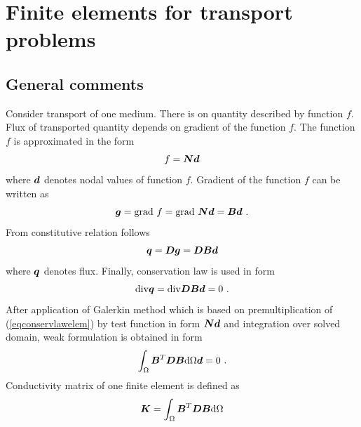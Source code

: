 \chapter{Finite elements for transport problems}
\label{finitelements}

\section{General comments}
\label{sectgencom}

Consider transport of one medium. There is on quantity described by function $f$.
Flux of transported quantity depends on gradient of the function $f$. The function
$f$ is approximated in the form
\begin{equation}
f = \mbox{\boldmath$N$} \mbox{\boldmath$d$}
\end{equation}
where $\mbox{\boldmath$d$}$ denotes nodal values of function $f$. Gradient of the function $f$ can be written as
\begin{equation}
\mbox{\boldmath$g$} = {\rm grad}\ f = {\rm grad}\ \mbox{\boldmath$N$} \mbox{\boldmath$d$} = \mbox{\boldmath$B$} \mbox{\boldmath$d$}\ .
\end{equation}
From constitutive relation follows
\begin{equation}
\mbox{\boldmath$q$} = \mbox{\boldmath$D$} \mbox{\boldmath$g$} = \mbox{\boldmath$D$} \mbox{\boldmath$B$} \mbox{\boldmath$d$}
\end{equation}
where $\mbox{\boldmath$q$}$ denotes flux. Finally, conservation law is used in form
\begin{equation}\label{eqconservlawelem}
{\rm div} \mbox{\boldmath$q$} = {\rm div} \mbox{\boldmath$D$} \mbox{\boldmath$B$} \mbox{\boldmath$d$} = 0\ .
\end{equation}
After application of Galerkin method which is based on premultiplication of (\ref{eqconservlawelem}) by test
function in form $\mbox{\boldmath$N$}\mbox{\boldmath$d$}$ and integration over solved domain, weak formulation is obtained in form
\begin{equation}
\int_{\Omega} \mbox{\boldmath$B$}^T \mbox{\boldmath$D$} \mbox{\boldmath$B$} {\rm d}\Omega \mbox{\boldmath$d$} = 0\ .
\end{equation}
Conductivity matrix of one finite element is defined as
\begin{equation}
\mbox{\boldmath$K$} = \int_{\Omega} \mbox{\boldmath$B$}^T \mbox{\boldmath$D$} \mbox{\boldmath$B$} {\rm d}\Omega
\end{equation}

